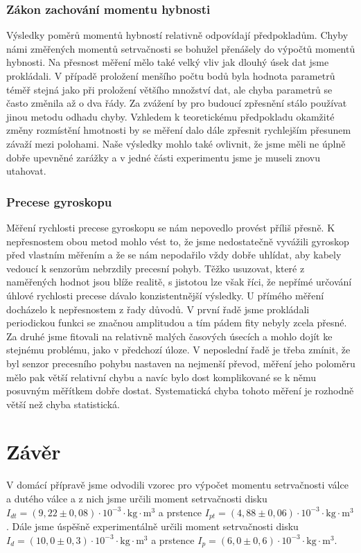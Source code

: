 \documentclass[english]{article}
\newcommand{\unit}[1]{\mathrm{#1}}
\begin{document}
	\subsubsection{Zákon zachování momentu hybnosti}
		Výsledky poměrů momentů hybností relativně odpovídají předpokladům. Chyby námi změřených momentů setrvačnosti se bohužel přenášely do výpočtů momentů hybnosti. Na přesnost měření mělo také velký vliv jak dlouhý úsek dat jsme prokládali. V případě proložení menšího počtu bodů byla hodnota parametrů téměř stejná jako při proložení většího množství dat, ale chyba parametrů se často změnila až o dva řády. Za zvážení by pro budoucí zpřesnění stálo používat jinou metodu odhadu chyby. Vzhledem k teoretickému předpokladu okamžité změny rozmístění hmotnosti by se měření dalo dále zpřesnit rychlejším přesunem závaží mezi polohami. Naše výsledky mohlo také ovlivnit, že jsme měli ne úplně dobře upevněné zarážky a v jedné části experimentu jsme je museli znovu utahovat.
		
	\subsubsection{Precese gyroskopu}
		Měření rychlosti precese gyroskopu se nám nepovedlo provést příliš přesně. K nepřesnostem obou metod mohlo vést to, že jsme nedostatečně vyvážili gyroskop před vlastním měřením a že se nám nepodařilo vždy dobře uhlídat, aby kabely vedoucí k senzorům nebrzdily precesní pohyb. Těžko usuzovat, které z naměřených hodnot jsou blíže realitě, s jistotou lze však říci, že nepřímé určování úhlové rychlosti precese dávalo konzistentnější výsledky. U přímého měření docházelo k nepřesnostem z řady důvodů. V první řadě jsme prokládali periodickou funkci se značnou amplitudou a tím pádem fity nebyly zcela přesné. Za druhé jsme fitovali na relativně malých časových úsecích a mohlo dojít ke stejnému problému, jako v předchozí úloze. V neposlední řadě je třeba zmínit, že byl senzor precesního pohybu nastaven na nejmenší převod, měření jeho poloměru mělo pak větší relativní chybu a navíc bylo dost komplikované se k němu posuvným měřítkem dobře dostat. Systematická chyba tohoto měření je rozhodně větší než chyba statistická.
		
\section{Závěr}
	V domácí přípravě jsme odvodili vzorec pro výpočet momentu setrvačnosti válce a dutého válce a z nich jsme určili moment setrvačnosti disku $I_{dt} = (9,22\pm0,08) \cdot \unit{10^{-3} \cdot kg \cdot m^3}$ a prstence $I_{pt} = (4,88\pm0,06) \cdot \unit{10^{-3} \cdot kg \cdot m^3}$. Dále jsme úspěšně experimentálně určili moment setrvačnosti disku $I_{d} = (10,0\pm0,3) \cdot \unit{10^{-3} \cdot kg \cdot m^3} $ a prstence $I_{p} = (6,0\pm0,6) \cdot \unit{10^{-3} \cdot kg \cdot m^3}$.
	
\end{document}
